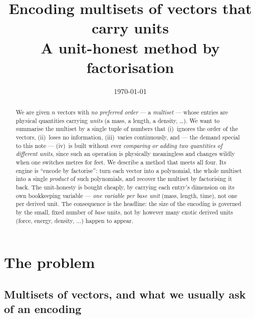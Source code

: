 \documentclass[11pt,a4paper]{article}
\title{\bfseries Encoding multisets of vectors that carry units\\[2pt]
       \large A unit-honest method by factorisation}
\author{}
\date{\today}
\theoremstyle{definition}
\theoremstyle{plain}
\begin{document}
\maketitle

\begin{abstract}
\noindent
We are given $n$ vectors with \emph{no preferred order} --- a \emph{multiset} ---
whose entries are physical quantities carrying \emph{units} (a mass, a length, a
density, \ldots). We want to summarise the multiset by a single tuple of numbers
that (i)~ignores the order of the vectors, (ii)~loses no information, (iii)~varies
continuously, and --- the demand special to this note --- (iv)~is built without
ever \emph{comparing or adding two quantities of different units}, since such an
operation is physically meaningless and changes wildly when one switches metres
for feet. We describe a method that meets all four. Its engine is ``encode by
factorise'': turn each vector into a polynomial, the whole multiset into a single
\emph{product} of such polynomials, and recover the multiset by factorising it
back. The unit-honesty is bought cheaply, by carrying each entry's dimension on
its own bookkeeping variable --- \emph{one variable per base unit}
(mass, length, time), not one per derived unit. The consequence is the headline:
the size of the encoding is governed by the small, fixed number of \emph{base}
units, not by however many exotic derived units (force, energy, density,
$\ldots$) happen to appear.
\end{abstract}

\tableofcontents
\bigskip

\section{The problem}
\label{sec:problem}

\subsection{Multisets of vectors, and what we usually ask of an encoding}
\end{document}

